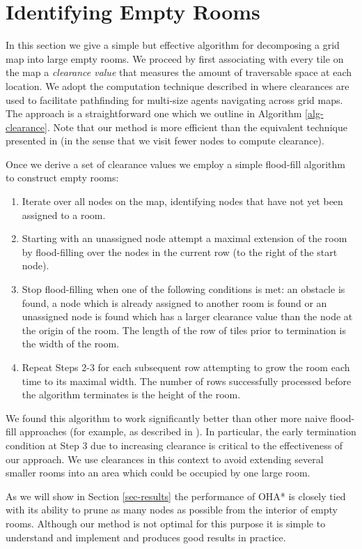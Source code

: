 \section{Identifying Empty Rooms}
\label{empty rooms}
In this section we give a simple but effective algorithm for decomposing a grid map
into large empty rooms.
We proceed by first associating with every tile on the map a \emph{clearance value} 
that measures the amount of traversable space at each location.
We adopt the computation technique described in \cite{harabor08} where clearances
are used to facilitate pathfinding for multi-size agents navigating across grid maps.
The approach is a straightforward one which we outline in Algorithm \ref{alg-clearance}.
Note that our method is more efficient than the equivalent technique presented
in \cite{harabor08} (in the sense that we visit fewer nodes to compute clearance).



Once we derive a set of clearance values we employ a simple flood-fill algorithm to 
construct empty rooms:

\begin{enumerate}
\item{Iterate over all nodes on the map, identifying nodes that have not yet 
been assigned to a room.}
\item{Starting with an unassigned node attempt a maximal extension of the room
by flood-filling over the nodes in the current row (to the right of the start node).}
\item{Stop flood-filling when one of the following conditions is met: an obstacle is found,
a node which is already assigned to another room is found or an unassigned
node is found which has a larger clearance value than the node at the origin of the room.
The length of the row of tiles prior to termination is the width of the room.}
\item{Repeat Steps 2-3 for each subsequent row attempting to grow the room
each time to its maximal width.
The number of rows successfully processed before the algorithm terminates is the height of the room.}
\end{enumerate}

We found this algorithm to work significantly better than other more naive flood-fill
approaches (for example, as described in \cite{bjornsson06,bolanca09}). 
In particular, the early termination condition at Step 3 
due to increasing clearance is critical to the effectiveness of our approach.
We use clearances in this context to avoid extending several smaller rooms into an area which
could be occupied by one large room.

As we will show in Section \ref{sec-results} the performance of OHA* is closely
tied with its ability to prune as many nodes as possible from the interior of 
empty rooms. 
Although our method is not optimal for this purpose it is simple
to understand and implement and produces good results in practice.
